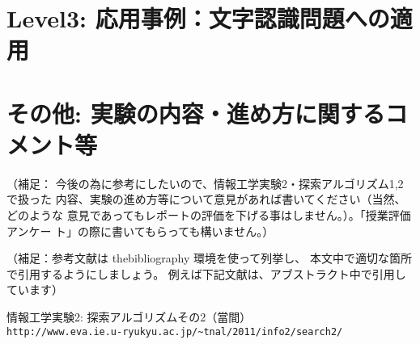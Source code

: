 \documentclass[10pt]{jarticle}
\begin{document}
\newpage

\section{Level3: 応用事例：文字認識問題への適用}





\newpage
\section{その他: 実験の内容・進め方に関するコメント等}
（補足：
今後の為に参考にしたいので、情報工学実験2・探索アルゴリズム1,2で扱った
内容、実験の進め方等について意見があれば書いてください（当然、どのような
意見であってもレポートの評価を下げる事はしません。）。「授業評価アンケー
ト」の際に書いてもらっても構いません。）


\vspace{+1.0cm}
（補足：参考文献は thebibliography 環境を使って列挙し、
本文中で適切な箇所で引用するようにしましょう。
例えば下記文献は、アブストラクト中で引用しています）
\begin{thebibliography}{99}
情報工学実験2: 探索アルゴリズムその2（當間）\\
\verb|http://www.eva.ie.u-ryukyu.ac.jp/~tnal/2011/info2/search2/|
\end{thebibliography}
\end{document}
